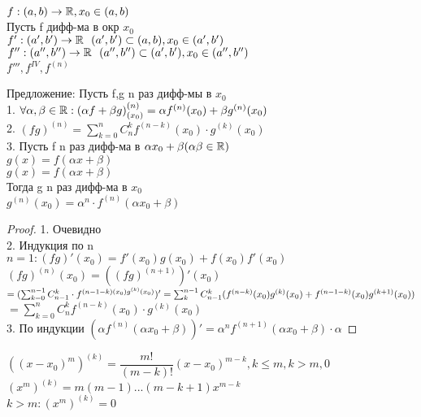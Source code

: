 
\begin{definition}
	$ f : (a,b) \rightarrow \mathbb{R}, x_0 \in (a,b) $ \\
	Пусть f дифф-ма в окр $x_0 $ \\
	$ f' : (a', b') \rightarrow \mathbb{R} \ \ (a', b') \subset (a,b), x_0 \in (a',b') $ \\
	$ f'' : (a'', b'') \rightarrow \mathbb{R} \ \  (a'', b'') \subset (a',b'), x_0 \in (a'',b'') $ \\
	$ f''', f^{IV}, f^{(n)} $
\end{definition}

Предложение: Пусть f,g n раз дифф-мы в $x_0$ \\
1. $ \forall \alpha, \beta \in \mathbb{R} : (\alpha f + \beta g)^{(n)}_{(x_0)} = \alpha f^{(n)} (x_0) + \beta g^{(n)} (x_0)  $\\
2. $ (fg)^{(n)} = \sum_{k=0}^{n} C^k_n f^{(n-k)} (x_0) \cdot g^{(k)} (x_0) $\\
3. Пусть f n раз дифф-ма в $ \alpha x_0 + \beta (\alpha \beta \in \mathbb{R}) $ \\
$ g(x) = f(\alpha x + \beta) $ \\
$ g(x) = f(\alpha x + \beta) $ \\
Тогда g n раз дифф-ма в $x_0$ \\
$ g^{(n)} (x_0) = \alpha^n\cdot f^{(n)} (\alpha x_0 + \beta) $ \\
\begin{proof}
	1. Очевидно \\
	2. Индукция по n \\
	$ n = 1 : (fg)'(x_0) = f'(x_0)g(x_0) + f(x_0) f'(x_0) $ \\
	$ (fg)^{(n)} (x_0) = ((fg)^{(n+1)})' (x_0) $ \\
	$ = (\sum_{k=0}^{n-1} C^k_{n-1} \cdot f^{(n-1-k) (x_0) g^{(k)} (x_0)} )' \\
	= \sum_{k}^{n-1} C^k_{n-1} (f^{(n-k)} (x_0) g^{(k)} (x_0) + f^{(n-1-k)} (x_0) g^{(k+1)} (x_0))  $\\
	$ =  \sum_{k=0}^{n} C^k_n f^{(n-k)} (x_0) \cdot g^{(k)} (x_0) $\\
	3. По индукции  $ (\alpha f^{(n)} (\alpha x_0 + \beta) )' = \alpha^n f^{(n+1)} (\alpha x_0 + \beta) \cdot \alpha $ 
\end{proof}

$ ((x - x_0)^m)^{(k)} = \dfrac{m!}{(m-k)!} (x-x_0)^{m-k}, k \leq m, k > m, 0 $
$ (x^m)^{(k)} = m(m-1)...(m-k+1)x^{m-k} $ \\
$ k > m : (x^m)^{(k)} = 0 $ \\

